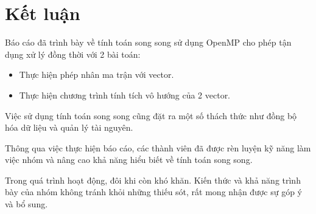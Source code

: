 \newpage
\section*{Kết luận}
 {}

Báo cáo đã trình bày về tính toán song song sử dụng OpenMP cho phép tận dụng xử lý đồng thời với 2 bài toán:

\begin{itemize}
 \item Thực hiện phép nhân ma trận với vector.
 \item Thực hiện chương trình tính tích vô hướng của 2 vector.
\end{itemize}

Việc sử dụng tính toán song song cũng đặt ra một số thách thức như đồng bộ hóa dữ liệu và quản lý tài nguyên.

Thông qua việc thực hiện báo cáo, các thành viên đã được rèn luyện kỹ năng làm việc nhóm và nâng cao khả năng hiểu biết về tính toán song song.

Trong quá trình hoạt động, đôi khi còn khó khăn. Kiến thức và khả năng trình bày của nhóm không tránh khỏi những thiếu sót, rất mong nhận được sự góp ý và bổ sung.
